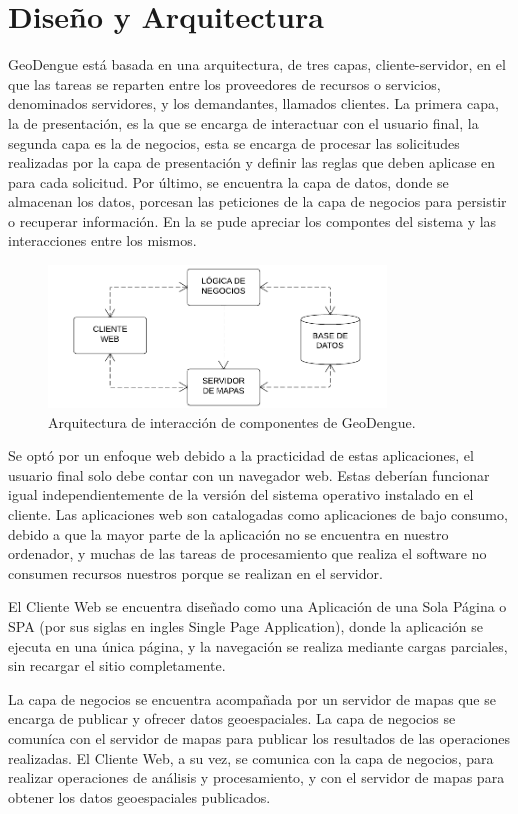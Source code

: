 \section{Diseño y Arquitectura}
GeoDengue está basada en una arquitectura, de tres capas, cliente-servidor, en el que las tareas
se reparten entre los proveedores de recursos o servicios, denominados servidores, y los
demandantes, llamados clientes. La primera capa, la de presentación, es la que se encarga de
interactuar con el usuario final, la segunda capa es la de negocios, esta se encarga de procesar
las solicitudes realizadas por la capa de presentación y definir las reglas que deben aplicase en
para cada solicitud. Por último, se encuentra la capa de datos, donde se almacenan los datos,
porcesan las peticiones de la capa de negocios para persistir o recuperar información. En la
 se pude apreciar los compontes del sistema y las interacciones
entre los mismos.

\begin{figure}
\centering
\includegraphics[width=0.8\textwidth]{capitulo-5/graphics/arquitectura-completa.png}
\caption{\label{fig:arquitectura-completa}Arquitectura de interacción de componentes de GeoDengue.}
\end{figure}

Se optó por un enfoque web debido a la practicidad de estas aplicaciones, el usuario final solo
debe contar con un navegador web. Estas deberían funcionar igual independientemente de la versión
del sistema operativo instalado en el cliente. Las aplicaciones web son catalogadas como
aplicaciones de bajo consumo, debido a que la mayor parte de la aplicación no se encuentra en
nuestro ordenador, y muchas de las tareas de procesamiento que realiza el software no consumen
recursos nuestros porque se realizan en el servidor.

El Cliente Web se encuentra diseñado como una Aplicación de una Sola Página o SPA (por sus siglas
en ingles Single Page Application), donde la aplicación se ejecuta en una única página, y la
navegación se realiza mediante cargas parciales, sin recargar el sitio completamente.

La capa de negocios se encuentra acompañada por un servidor de mapas que se encarga de publicar y
ofrecer datos geoespaciales. La capa de negocios se comuníca con el servidor de mapas para
publicar los resultados de las operaciones realizadas. El Cliente Web, a su vez, se comunica con
la capa de negocios, para realizar operaciones de análisis y procesamiento, y con el servidor de
mapas para obtener los datos geoespaciales publicados.
